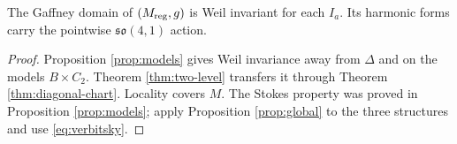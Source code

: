 \begin{corollary}\label{thm:T2}
The Gaffney domain of $(M_{\mathrm{reg}},g)$ is Weil invariant for
each $I_a$. Its harmonic forms carry the pointwise
$\mathfrak{so}(4,1)$ action.
\end{corollary}
\begin{proof}
Proposition \ref{prop:models} gives Weil invariance away from
$\Delta$ and on the models $B\times C_2$. Theorem
\ref{thm:two-level} transfers it through Theorem
\ref{thm:diagonal-chart}. Locality covers $M$. The Stokes
property was proved in Proposition \ref{prop:models}; apply
Proposition \ref{prop:global} to the three structures and use
\eqref{eq:verbitsky}.
\end{proof}
